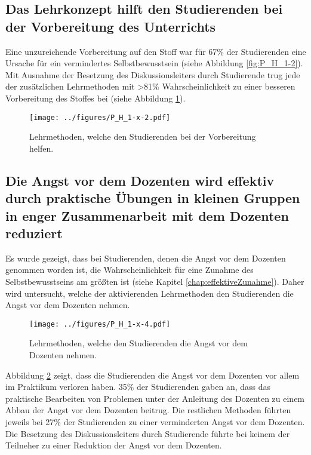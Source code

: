 \subsection{Das Lehrkonzept hilft den Studierenden bei der Vorbereitung des Unterrichts}
Eine unzureichende Vorbereitung auf den Stoff war für 67\% der Studierenden eine Ursache für ein vermindertes Selbstbewusstsein (siehe Abbildung \ref{fig:P_H_1-2}). Mit Ausnahme der Besetzung des Diskussionsleiters durch Studierende trug jede der zusätzlichen Lehrmethoden mit >81\% Wahrscheinlichkeit zu einer besseren Vorbereitung des Stoffes bei (siehe Abbildung \ref{fig:P_H_1-x-2}).
\begin{figure}[h!]
\begin{center}
	\texttt{[image: ../figures/P\_H\_1-x-2.pdf]}
\end{center}
	\caption{Lehrmethoden, welche den Studierenden bei der Vorbereitung helfen.}
	\label{fig:P_H_1-x-2}
\end{figure}

\subsection{Die Angst vor dem Dozenten wird effektiv durch praktische Übungen in kleinen Gruppen in enger Zusammenarbeit mit dem Dozenten reduziert}
Es wurde gezeigt, dass bei Studierenden, denen die Angst vor dem Dozenten genommen worden ist, die Wahrscheinlichkeit für eine Zunahme des Selbstbewusstseins am größten ist (siehe Kapitel \ref{chap:effektiveZunahme}). Daher wird untersucht, welche der aktivierenden Lehrmethoden den Studierenden die Angst vor dem Dozenten nehmen.
\begin{figure}[h!]
\begin{center}
	\texttt{[image: ../figures/P\_H\_1-x-4.pdf]}
\end{center}
	\caption{Lehrmethoden, welche den Studierenden die Angst vor dem Dozenten nehmen.}
	\label{fig:P_H_1-x-4}
\end{figure}
Abbildung \ref{fig:P_H_1-x-4} zeigt, dass die Studierenden die Angst vor dem Dozenten vor allem im Praktikum verloren haben. 35\% der Studierenden gaben an, dass das praktische Bearbeiten von Problemen unter der Anleitung des Dozenten zu einem Abbau der Angst vor dem Dozenten beitrug. Die restlichen Methoden führten jeweils bei 27\% der Studierenden zu einer verminderten Angst vor dem Dozenten. Die Besetzung des Diskussionsleiters durch Studierende führte bei keinem der Teilneher zu einer Reduktion der Angst vor dem Dozenten.